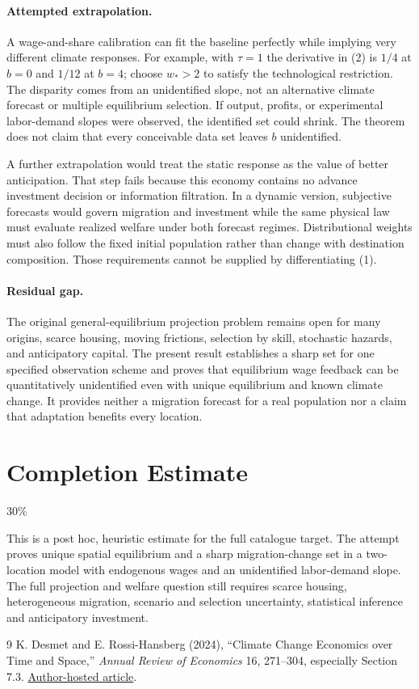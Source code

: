 \documentclass[11pt]{article}
\theoremstyle{definition}
\begin{document}
\paragraph{Attempted extrapolation.}
A wage-and-share calibration can fit the baseline perfectly while implying very different climate responses. For example, with $\tau=1$ the derivative in (2) is $1/4$ at $b=0$ and $1/12$ at $b=4$; choose $w_*>2$ to satisfy the technological restriction. The disparity comes from an unidentified slope, not an alternative climate forecast or multiple equilibrium selection. If output, profits, or experimental labor-demand slopes were observed, the identified set could shrink. The theorem does not claim that every conceivable data set leaves $b$ unidentified.

A further extrapolation would treat the static response as the value of better anticipation. That step fails because this economy contains no advance investment decision or information filtration. In a dynamic version, subjective forecasts would govern migration and investment while the same physical law must evaluate realized welfare under both forecast regimes. Distributional weights must also follow the fixed initial population rather than change with destination composition. Those requirements cannot be supplied by differentiating (1).

\paragraph{Residual gap.}
The original general-equilibrium projection problem remains open for many origins, scarce housing, moving frictions, selection by skill, stochastic hazards, and anticipatory capital. The present result establishes a sharp set for one specified observation scheme and proves that equilibrium wage feedback can be quantitatively unidentified even with unique equilibrium and known climate change. It provides neither a migration forecast for a real population nor a claim that adaptation benefits every location.

\section{Completion Estimate}
30\%

This is a post hoc, heuristic estimate for the full catalogue target.
The attempt proves unique spatial equilibrium and a sharp migration-change set in a two-location model with endogenous wages and an unidentified labor-demand slope. The full projection and welfare question still requires scarce housing, heterogeneous migration, scenario and selection uncertainty, statistical inference and anticipatory investment.

\begin{thebibliography}{9}
 K. Desmet and E. Rossi-Hansberg (2024), ``Climate Change Economics over Time and Space,'' \emph{Annual Review of Economics} 16, 271--304, especially Section 7.3. \href{https://rossihansberg.economics.uchicago.edu/CCETS.pdf}{Author-hosted article}.
\end{thebibliography}
\end{document}
